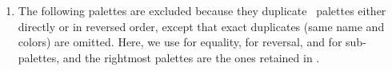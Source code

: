 \documentclass{tutodoc}
\begin{document}

\begin{enumerate}
    \item The following palettes are excluded because they duplicate \thisproj\ palettes either directly or in reversed order, except that exact duplicates (same name and colors) are omitted.
    Here, we use
    \boxed{{=}\vphantom{\prec}} for equality,
    \boxed{{\rightleftharpoons}\vphantom{\prec}} for reversal, 
    and
    \boxed{{\prec}} for sub-palettes, 
    and the rightmost palettes are the ones retained in \thisproj.
\end{enumerate}

\end{document}
